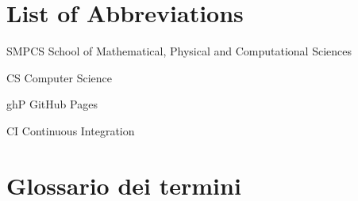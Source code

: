 \section{List of Abbreviations}
\begin{abbrv}
    \item[SMPCS]			School of Mathematical, Physical and Computational Sciences
    \item[CS]				Computer Science
    \item[ghP]           GitHub Pages
    \item[CI]       Continuous Integration
\end{abbrv}

\section{Glossario dei termini}

